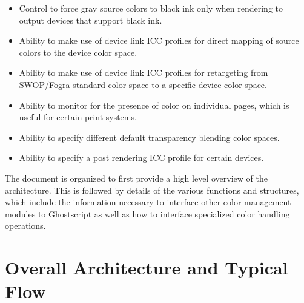 \documentclass[12pt,notitlepage]{article}
\begin{document}
\begin{itemize}
\item Control to force gray source colors to black ink only when rendering to output devices that support black ink.
\item Ability to make use of device link ICC profiles for direct mapping of source colors to the device color space.
\item Ability to make use of device link ICC profiles for retargeting from SWOP/Fogra standard color space to a specific device color space.
\item Ability to monitor for the presence of color on individual pages, which is useful for certain print systems.
\item Ability to specify different default transparency blending color spaces.
\item Ability to specify a post rendering ICC profile for certain devices.
\end{itemize}
The document is organized to first provide a high level overview of the architecture. This is followed by details of the various functions and structures, which include the information necessary to interface other color management modules to Ghostscript as well as how to interface specialized color handling operations.

\section{Overall Architecture and Typical Flow}
\end{document}
